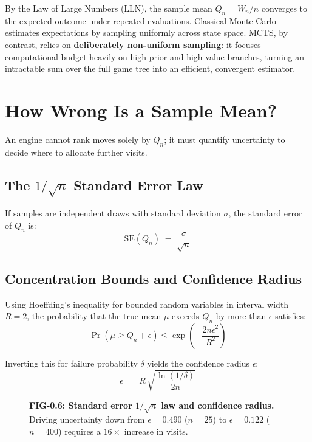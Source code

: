 \begin{bridge}
By the Law of Large Numbers (LLN), the sample mean $Q_n = W_n/n$ converges to the expected outcome under repeated evaluations. Classical Monte Carlo estimates expectations by sampling uniformly across state space. MCTS, by contrast, relies on \textbf{deliberately non-uniform sampling}: it focuses computational budget heavily on high-prior and high-value branches, turning an intractable sum over the full game tree into an efficient, convergent estimator.
\end{bridge}

\section{How Wrong Is a Sample Mean?}
\label{sec:0_5}

An engine cannot rank moves solely by $Q_n$; it must quantify uncertainty to decide where to allocate further visits.

\subsection{The $1/\sqrt{n}$ Standard Error Law}

If samples are independent draws with standard deviation $\sigma$, the standard error of $Q_n$ is:
\begin{equation}
\label{eq:E5}
\boxed{\;\text{SE}(Q_n) \;=\; \frac{\sigma}{\sqrt{n}}\;}
\end{equation}

\subsection{Concentration Bounds and Confidence Radius}

Using Hoeffding's inequality for bounded random variables in interval width $R = 2$, the probability that the true mean $\mu$ exceeds $Q_n$ by more than $\epsilon$ satisfies:
$$\Pr(\mu \ge Q_n + \epsilon) \le \exp\left(-\frac{2n\epsilon^2}{R^2}\right)$$

Inverting this for failure probability $\delta$ yields the confidence radius $\epsilon$:
\begin{equation}
\label{eq:E6}
\boxed{\;\epsilon \;=\; R\,\sqrt{\frac{\ln(1/\delta)}{2n}}\;}
\end{equation}

\begin{figure}[htbp]
\centering

\caption{\textbf{FIG-0.6: Standard error $1/\sqrt{n}$ law and confidence radius.} Driving uncertainty down from $\epsilon = 0.490$ ($n=25$) to $\epsilon = 0.122$ ($n=400$) requires a $16\times$ increase in visits.}
\label{fig:0_6}
\end{figure}

